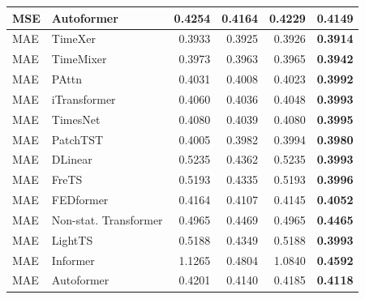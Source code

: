 \begin{longtable}{llrrrr}
MSE & Autoformer & 0.4254 & 0.4164 & 0.4229 & \textbf{0.4149} \\
\midrule
MAE & TimeXer & 0.3933 & 0.3925 & 0.3926 & \textbf{0.3914} \\
MAE & TimeMixer & 0.3973 & 0.3963 & 0.3965 & \textbf{0.3942} \\
MAE & PAttn & 0.4031 & 0.4008 & 0.4023 & \textbf{0.3992} \\
MAE & iTransformer & 0.4060 & 0.4036 & 0.4048 & \textbf{0.3993} \\
MAE & TimesNet & 0.4080 & 0.4039 & 0.4080 & \textbf{0.3995} \\
MAE & PatchTST & 0.4005 & 0.3982 & 0.3994 & \textbf{0.3980} \\
MAE & DLinear & 0.5235 & 0.4362 & 0.5235 & \textbf{0.3993} \\
MAE & FreTS & 0.5193 & 0.4335 & 0.5193 & \textbf{0.3996} \\
MAE & FEDformer & 0.4164 & 0.4107 & 0.4145 & \textbf{0.4052} \\
MAE & Non-stat. Transformer & 0.4965 & 0.4469 & 0.4965 & \textbf{0.4465} \\
MAE & LightTS & 0.5188 & 0.4349 & 0.5188 & \textbf{0.3993} \\
MAE & Informer & 1.1265 & 0.4804 & 1.0840 & \textbf{0.4592} \\
MAE & Autoformer & 0.4201 & 0.4140 & 0.4185 & \textbf{0.4118} \\
\end{longtable}
\endgroup

